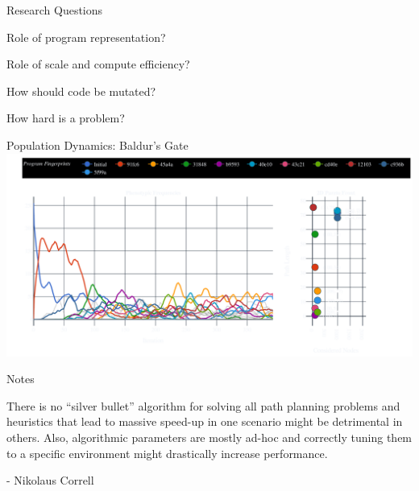 \documentclass[aspectratio=169]{beamer}
\begin{document}
\begin{frame}{Research Questions}
  \begin{vfilleditems}
    \item {\Huge Role of program representation?}
    \item {\Huge Role of scale and compute efficiency?}
    \item {\Huge How should code be mutated?}
    \item {\Huge How hard is a problem?}
  \end{vfilleditems}
\end{frame}

\begin{frame}{Population Dynamics: Baldur's Gate}
    \includegraphics[width=1.0\linewidth, keepaspectratio]{figures/baldurs_pheno_50.pdf}
\end{frame}

\begin{frame}{Notes}

There is no “silver bullet” algorithm for solving all path planning problems and heuristics that lead to massive speed-up in one scenario might be detrimental in others. Also, algorithmic parameters are mostly ad-hoc and correctly tuning them to a specific environment might drastically increase performance.

- Nikolaus Correll
\end{frame}
\end{document}

